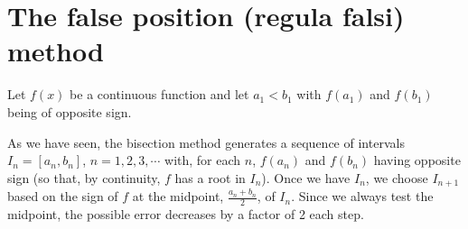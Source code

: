 \section{The false position (regula falsi) method}

Let $f(x)$ be a continuous function and let $a_1<b_1$ with $f(a_1)$ and $f(b_1)$ being of opposite sign.

As we have seen, the bisection method generates a sequence of intervals $I_n=[a_n,b_n]$, $n=1,2,3,\cdots$ with, for each $n$, $f(a_n)$ and $f(b_n)$ 
having opposite sign (so that, by continuity, $f$ has a root in $I_n$). 
Once we have $I_n$, we choose $I_{n+1}$ based on the sign of $f$ at 
the midpoint, $\frac{a_n+b_n}{2}$, of $I_n$. Since we always test the midpoint, the possible error decreases by a factor of 2 each step.

